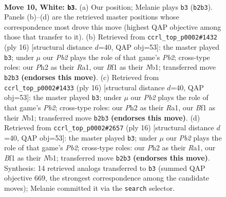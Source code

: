 \documentclass[11pt]{article}
\begin{document}
\clearpage

\begin{figure}[p]\centering
\begin{subfigure}{0.46\textwidth}\centering
\resizebox{\linewidth}{!}{%
\newchessgame
\chessboard[
  setfen={r1b1kbnr/p1ppq1p1/2p5/4Pp1p/2P2P2/8/PP2Q1PP/RNB1KB1R w KQkq f6 0 10},
  showmover=false,
  pgfstyle=straightmove, color=movearrow, markmove={b2-b3}
]}
\caption{}
\end{subfigure}\hfill
\begin{subfigure}{0.46\textwidth}\centering
\resizebox{\linewidth}{!}{%
\newchessgame
\chessboard[
  setfen={r3kb1r/p1ppqppp/b1p5/3nP3/2P5/8/PP2QPPP/RNB1KB1R w KQkq - 1 9},
  showmover=false,
  pgfstyle=straightmove, color=movearrow, markmove={b2-b3}
]}
\caption{}
\end{subfigure}
\\[4pt]
\begin{subfigure}{0.46\textwidth}\centering
\resizebox{\linewidth}{!}{%
\newchessgame
\chessboard[
  setfen={r3kb1r/p1ppqppp/b1p5/3nP3/2P5/8/PP2QPPP/RNB1KB1R w KQkq - 1 9},
  showmover=false,
  pgfstyle=straightmove, color=movearrow, markmove={b2-b3}
]}
\caption{}
\end{subfigure}\hfill
\begin{subfigure}{0.46\textwidth}\centering
\resizebox{\linewidth}{!}{%
\newchessgame
\chessboard[
  setfen={r3kb1r/p1ppqppp/b1p5/3nP3/2P5/8/PP2QPPP/RNB1KB1R w KQkq - 1 9},
  showmover=false,
  pgfstyle=straightmove, color=movearrow, markmove={b2-b3}
]}
\caption{}
\end{subfigure}
\caption{\textbf{Move 10, White: \texttt{b3}.} (a) Our position; Melanie plays \texttt{b3} (\texttt{b2b3}). Panels (b)--(d) are the retrieved master positions whose correspondence most drove this move (highest QAP objective among those that transfer to it). (b) Retrieved from \texttt{ccrl\_top\_p0002\#1432} (ply 16) [structural distance $d$=40, QAP obj=53]: the master played \texttt{b3}; under $\mu$ our \emph{Pb2} plays the role of that game's \emph{Pb2}; cross-type roles: our \emph{P}h2 as their \emph{R}a1, our \emph{B}f1 as their \emph{N}b1; transferred move \texttt{b2b3} \textbf{(endorses this move)}. (c) Retrieved from \texttt{ccrl\_top\_p0002\#1433} (ply 16) [structural distance $d$=40, QAP obj=53]: the master played \texttt{b3}; under $\mu$ our \emph{Pb2} plays the role of that game's \emph{Pb2}; cross-type roles: our \emph{P}h2 as their \emph{R}a1, our \emph{B}f1 as their \emph{N}b1; transferred move \texttt{b2b3} \textbf{(endorses this move)}. (d) Retrieved from \texttt{ccrl\_top\_p0002\#2657} (ply 16) [structural distance $d$=40, QAP obj=53]: the master played \texttt{b3}; under $\mu$ our \emph{Pb2} plays the role of that game's \emph{Pb2}; cross-type roles: our \emph{P}h2 as their \emph{R}a1, our \emph{B}f1 as their \emph{N}b1; transferred move \texttt{b2b3} \textbf{(endorses this move)}. Synthesis: 14 retrieved analogs transferred to \texttt{b3} (summed QAP objective 669, the strongest correspondence among the candidate moves); Melanie committed it via the \texttt{search} selector.}
\label{fig:thought-m18}
\end{figure}
\end{document}
